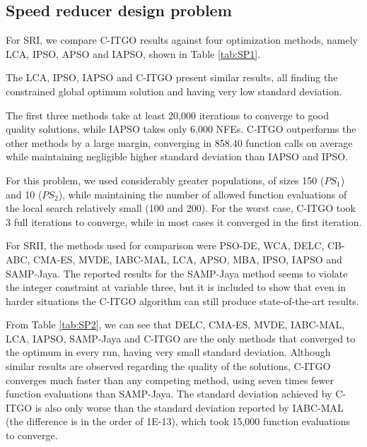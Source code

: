 \subsection{Speed reducer design problem}




For SRI, we compare C-ITGO results against four optimization methods, namely LCA, IPSO, APSO and IAPSO, shown in Table \ref{tab:SP1}.

The LCA, IPSO, IAPSO and C-ITGO present similar results, all finding the constrained global optimum solution and having very low standard deviation.




The first three methods take at least 20,000 iterations to converge to good quality solutions, while IAPSO takes only 6,000 NFEs. C-ITGO outperforms the other methods by a large margin, converging in 858.40 function calls on average while maintaining negligible higher standard deviation than IAPSO and IPSO.

For this problem, we used considerably greater populations, of sizes 150 ($PS_1$) and 10 ($PS_2$), while maintaining the number of allowed function evaluations of the local search relatively small (100 and 200). For the worst case, C-ITGO took 3 full iterations to converge, while in most cases it converged in the first iteration.

For SRII, the methods used for comparison were PSO-DE, WCA, DELC, CB-ABC, CMA-ES, MVDE, IABC-MAL, LCA, APSO, MBA, IPSO, IAPSO and SAMP-Jaya. The reported results for the SAMP-Jaya method seems to violate the integer constraint at variable three, but it is included to show that even in harder situations the C-ITGO algorithm can still produce state-of-the-art results.

From Table \ref{tab:SP2}, we can see that DELC, CMA-ES, MVDE, IABC-MAL, LCA, IAPSO, SAMP-Jaya and C-ITGO are the only methods that converged to the optimum in every run, having very small standard deviation. Although similar results are observed regarding the quality of the solutions, C-ITGO converges much faster than any competing method, using seven times fewer function evaluations than SAMP-Jaya. The standard deviation achieved by C-ITGO is also only worse than the standard deviation reported by IABC-MAL (the difference is in the order of 1E-13), which took 15,000 function evaluations to converge.



